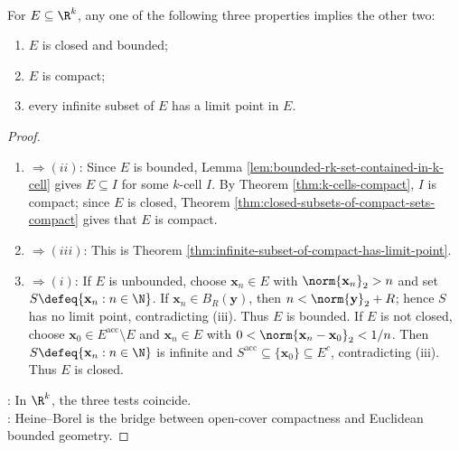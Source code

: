 \begin{theorem} \label{thm:heine-borel-rk} \\
For $E\subseteq\R^k$, any one of the following three properties implies the other two:
\begin{enumerate}[label=(\roman*)]
\setlength{\itemsep}{0pt}
\item $E$ is closed and bounded;
\item $E$ is compact;
\item every infinite subset of $E$ has a limit point in $E$.
\end{enumerate}
\begin{proof}
\begin{enumerate}[label=(\roman*)]
\setlength{\itemsep}{0pt}
\item[$(i)$]$\Rightarrow(ii)$: Since $E$ is bounded, Lemma \ref{lem:bounded-rk-set-contained-in-k-cell} gives $E\subseteq I$ for some $k$-cell $I$. By Theorem \ref{thm:k-cells-compact}, $I$ is compact; since $E$ is closed, Theorem \ref{thm:closed-subsets-of-compact-sets-compact} gives that $E$ is compact.
\item[$(ii)$]$\Rightarrow(iii)$: This is Theorem \ref{thm:infinite-subset-of-compact-has-limit-point}.
\item[$(iii)$]$\Rightarrow(i)$: If $E$ is unbounded, choose $\mathbf{x}_n\in E$ with $\norm{\mathbf{x}_n}_2>n$ and set $S\defeq\{\mathbf{x}_n:n\in\N\}$. If $\mathbf{x}_n\in B_R(\mathbf{y})$, then $n<\norm{\mathbf{y}}_2+R$; hence $S$ has no limit point, contradicting (iii). Thus $E$ is bounded. If $E$ is not closed, choose $\mathbf{x}_0\in E^{\operatorname{acc}}\setminus E$ and $\mathbf{x}_n\in E$ with $0<\norm{\mathbf{x}_n-\mathbf{x}_0}_2<1/n$. Then $S\defeq\{\mathbf{x}_n:n\in\N\}$ is infinite and $S^{\operatorname{acc}}\subseteq\{\mathbf{x}_0\}\subseteq E^c$, contradicting (iii). Thus $E$ is closed.
\end{enumerate}
: In $\R^k$, the three tests coincide.\\
: Heine--Borel is the bridge between open-cover compactness and Euclidean bounded geometry.
\end{proof}
\end{theorem}

